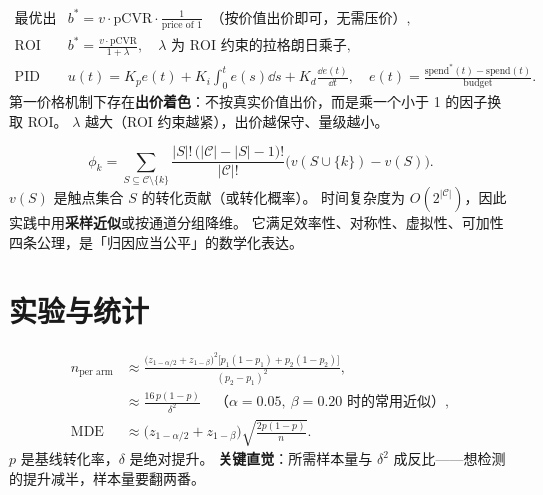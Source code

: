 \begin{formulacard}
\begin{align}
\text{最优出价（无约束）} \quad & b^* = v \cdot \text{pCVR} \cdot \frac{1}{\text{price of } 1} \;\; \text{（按价值出价即可，无需压价）} , \\
\text{ROI 约束下的出价} \quad & b^* = \frac{v \cdot \text{pCVR}}{1 + \lambda} ,
\quad \lambda \text{ 为 ROI 约束的拉格朗日乘子} , \\
\text{PID 预算控制} \quad & u(t) = K_p e(t) + K_i \!\int_0^t\! e(s)\dd s + K_d \frac{\dd e(t)}{\dd t} ,
\quad e(t) = \frac{\text{spend}^*(t) - \text{spend}(t)}{\text{budget}} .
\end{align}
第一价格机制下存在\textbf{出价着色}：不按真实价值出价，而是乘一个小于 1 的因子换取 ROI。
$\lambda$ 越大（ROI 约束越紧），出价越保守、量级越小。
\end{formulacard}

\begin{formulacard}
\begin{equation}
\phi_k = \sum_{S \subseteq \mathcal{C} \setminus \{k\}}
\frac{|S|!\,\big(|\mathcal{C}| - |S| - 1\big)!}{|\mathcal{C}|!}
\Big( v(S \cup \{k\}) - v(S) \Big) .
\end{equation}
$v(S)$ 是触点集合 $S$ 的转化贡献（或转化概率）。
时间复杂度为 $O(2^{|\mathcal{C}|})$，因此实践中用\textbf{采样近似}或按通道分组降维。
它满足效率性、对称性、虚拟性、可加性四条公理，是「归因应当公平」的数学化表达。
\end{formulacard}

\section{实验与统计}

\begin{formulacard}
\begin{align}
n_{\text{per arm}} &\approx \frac{\big(z_{1-\alpha/2} + z_{1-\beta}\big)^2 \big[p_1(1-p_1) + p_2(1-p_2)\big]}{(p_2 - p_1)^2} , \\
&\approx \frac{16 \, p(1-p)}{\delta^2} \quad \text{（}\alpha = 0.05,\ \beta = 0.20\text{ 时的常用近似）} , \\
\text{MDE} &\approx \big(z_{1-\alpha/2} + z_{1-\beta}\big)\sqrt{\frac{2p(1-p)}{n}} .
\end{align}
$p$ 是基线转化率，$\delta$ 是绝对提升。
\textbf{关键直觉}：所需样本量与 $\delta^2$ 成反比——想检测的提升减半，样本量要翻两番。
\end{formulacard}

